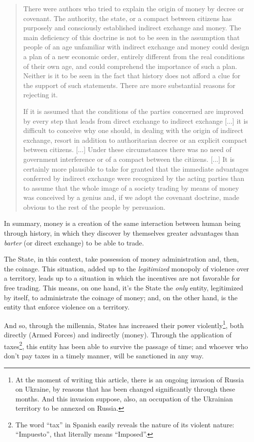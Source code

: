 \documentclass[12pt,a4paper]{article}
\begin{document}
\begin{quotation}
There were authors who tried to explain the origin of money by decree or covenant. The authority, the state, or a compact between citizens has purposely and consciously established indirect exchange and money. The main deficiency of this doctrine is not to be seen in the assumption that people of an age unfamiliar with indirect exchange and money could design a plan of a new economic order, entirely different from the real conditions of their own age, and could comprehend the importance of such a plan. Neither is it to be seen in the fact that history does not afford a clue for the support of such statements. There are more substantial reasons for rejecting it.

If it is assumed that the conditions of the parties concerned are improved by every step that leads from direct exchange to indirect exchange [...] it is difficult to conceive why one should, in dealing with the origin of indirect exchange, resort in addition to authoritarian decree or an explicit compact between citizens. [...] Under these circumstances there was no need of government interference or of a compact between the citizens. [...] It is certainly more plausible to take for granted that the immediate advantages conferred by indirect exchange were recognized by the acting parties than to assume that the whole image of a society trading by means of money was conceived by a genius and, if we adopt the covenant doctrine, made obvious to the rest of the people by persuasion. \cite[pp. 402-403]{mises:ha}
\end{quotation}

In summary, money is a creation of the same interaction between human being through history, in which they discover by themselves greater advantages than \textit{barter} (or direct exchange) to be able to trade.

The State, in this context, take possession of money administration and, then, the coinage. This situation, added up to the \textit{legitimized} monopoly of violence over a territory, leads up to a situation in which the incentives are not favorable for free trading. This means, on one hand, it's the State the \textit{only} entity, legitimized by itself, to administrate the coinage of money; and, on the other hand, is the entity that enforce violence on a territory.

And so, through the millennia, States has increased their power violently\footnote{At the moment of writing this article, there is an ongoing invasion of Russia on Ukraine, by reasons that has been changed significantly through these months. And this invasion suppose, also, an occupation of the Ukrainian territory to be annexed on Russia.}, both directly (Armed Forces) and indirectly (money). Through the application of taxes\footnote{The word “tax” in Spanish easily reveals the nature of its violent nature: “Impuesto”, that literally means “Imposed”.}, this entity has been able to survive the passage of time; and whoever who don't pay taxes in a timely manner, will be sanctioned in any way.
\end{document}
